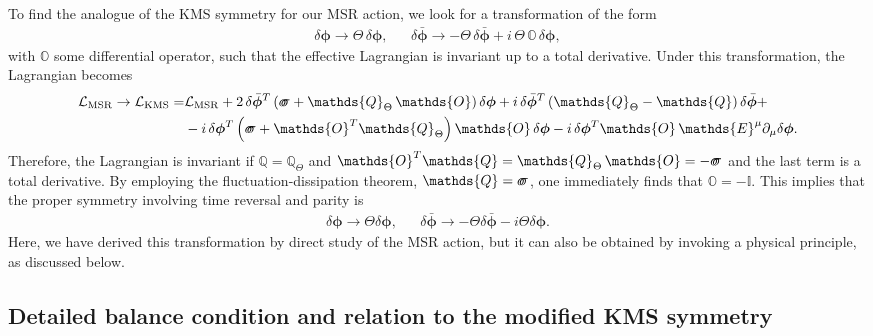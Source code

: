 \documentclass[aps,prd,nofootinbib,amsmath,amssymb,showpacs,longbibliography,singlecolumn,superscriptaddress,notitlepage]{revtex4-1}
\theoremstyle{plain}
\theoremstyle{definition}
\newcommand*{\Scale}[2][4]{\scalebox{#1}{$#2$}}%
\newcommand{\forceds}[1]{\Scale[1.1]{\ensuremath{\mathrlap{{{#1}}}\hspace{1.4pt}#1}}}
\newcommand{\cvec}[1]{\ensuremath{\bm {#1}}}
\newcommand{\cmat}[1]{\ensuremath{\mathds{{#1}}}}
\newcommand{\cmatgreek}[1]{\ensuremath{\forceds{{#1}}}}
\begin{document}
To find the analogue of the KMS symmetry for our MSR action, we look for a  transformation of the form 
\begin{align}
\label{eq:tentativeKMSsym}
&\delta \cvec{\phi} \rightarrow \Theta\, \delta \cvec{\phi} ,&  
&\delta \bar{\cvec{\phi}} \rightarrow - \Theta\, \delta \bar{\cvec{\phi}} + i \,\Theta\, \cmat{O}\, \delta \cvec{\phi} ,&
\end{align}
with $\cmat{O}$ some differential operator, such that the effective Lagrangian is invariant up to a total derivative.   
 Under this transformation, the Lagrangian becomes
\begin{align}
\begin{split}\label{eq:pseudoKMS_PT_derivation}
\mathcal{L}_{\mathrm{MSR}} \to \mathcal{L}_{\mathrm{KMS}} =& \mathcal{L}_{\mathrm{MSR}} 
+2\, \delta \bar{\cvec{\phi}}^T\left( \cmatgreek{\sigma} + \cmat{Q}_\Theta\,\cmat{O}\right)\delta\cvec{\phi}
+ i \,\delta \bar{\cvec{\phi}}^T\left(\cmat{Q}_\Theta - \cmat{Q}\right)\delta \bar{\cvec{\phi}} + \\
&-i\,\delta\cvec{\phi}^T\left(\cmatgreek{\sigma} +\cmat{O}^T\cmat{Q}_\Theta\right)\cmat{O}\,\delta\cvec{\phi}-i\,\delta\cvec{\phi}^T\cmat{O}\,\cmat{E}^\mu\partial_\mu \delta\cvec{\phi}.
\end{split}
\end{align}
Therefore, the  Lagrangian is invariant if $\cmat{Q} = \cmat{Q}_\Theta$ and $\cmat{O}^T\cmat{Q} = \cmat{Q}_\Theta\,\cmat{O} = - \cmatgreek{\sigma}$ and the last term is a total derivative. By employing the fluctuation-dissipation theorem, $\cmat{Q} = \cmatgreek{\sigma}$, one immediately finds that $\cmat{O} = -\cmat{I}$. This implies that the proper symmetry involving time reversal and parity is 
\begin{align}
    &\delta \cvec{\phi} \rightarrow \Theta \delta \cvec{\phi} ,& 
    & \delta \bar{\cvec{\phi}} \rightarrow - \Theta \delta \bar{\cvec{\phi}} - i \Theta \delta \cvec{\phi} .&
\end{align}
Here, we have derived this transformation by direct study of the MSR action, but it can also be obtained by invoking a physical principle, as discussed below.


\subsection{Detailed balance condition and relation to the modified KMS symmetry}
\label{Sec:detailed_balance}
\end{document}
